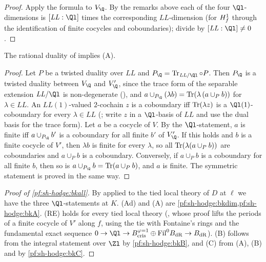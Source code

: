 \begin{proof}
Apply the formula to $V_\Q$. By the remarks above each of the four $\Ql$-dimensions is $[\mathit{LL}:\Ql]$ times the corresponding
$\mathit{LL}$-dimension (for $H^1_{f}$ through the identification of finite cocycles and coboundaries); divide by
$[\mathit{LL}:\Ql]\ne0$.
\end{proof}

\begin{lemma}\label{pf:sh-hodge:bkA}
The rational duality of \shhodgeBK{} implies (A).
\end{lemma}

\begin{proof}
Let $P$ be a twisted duality over $\mathit{LL}$ and $P_\Q=\shhodgeTr_{\mathit{LL}/\Ql}\circ P$. Then $P_\Q$ is a twisted duality between $V_\Q$
and $V'_\Q$, since the trace form of the separable extension $\mathit{LL}/\Ql$ is non-degenerate
(), and $a\cup_{P_\Q}(\lambda b)=\shhodgeTr(\lambda\,(a\cup_Pb))$ for $\lambda\in\mathit{LL}$. An
$\mathit{LL}(1)$-valued $2$-cochain $z$ is a coboundary iff $\operatorname{Tr}(\lambda z)$ is a $\Ql(1)$-coboundary for every $\lambda\in\mathit{LL}$
(; write $z$ in a $\Ql$-basis of $\mathit{LL}$ and use the dual basis for the trace form).
Let $a$ be a cocycle of $V$. By the $\Ql$-statement, $a$ is finite iff $a\cup_{P_\Q}b'$ is a coboundary for all finite $b'$ of $V'_\Q$. If
this holds and $b$ is a finite cocycle of $V'$, then $\lambda b$ is finite for every $\lambda$, so all $\operatorname{Tr}(\lambda(a\cup_Pb))$ are
coboundaries and $a\cup_Pb$ is a coboundary. Conversely, if $a\cup_Pb$ is a coboundary for all finite $b$, then so is
$a\cup_{P_\Q}b=\shhodgeTr(a\cup_Pb)$, and $a$ is finite. The symmetric statement is proved in the same way.
\end{proof}

\begin{proof}[Proof of \cref{pf:sh-hodge:bkall}]
By \shhodgeBK{} applied to the tied local theory of $D$ at $\ell$ we have the three $\Ql$-statements at $K$.
(Ad) and (A) are \cref{pf:sh-hodge:bkdim,pf:sh-hodge:bkA}. (RE) holds for every tied local theory
(, whose proof lifts the periods of a finite cocycle of $V'$ along $f$, using
the tie with Fontaine's rings and the fundamental exact sequence $0\to\Ql\to B_{\mathrm{cris}}^{\varphi=1}\oplus\mathrm{Fil}^0B_{\mathrm{dR}}
\to B_{\mathrm{dR}}$). (B) follows from the integral statement over $\Zl$ by
\cref{pf:sh-hodge:bkB}, and (C) from (A), (B) and \shhodgeLTD{} by \cref{pf:sh-hodge:bkC}.
\end{proof}

